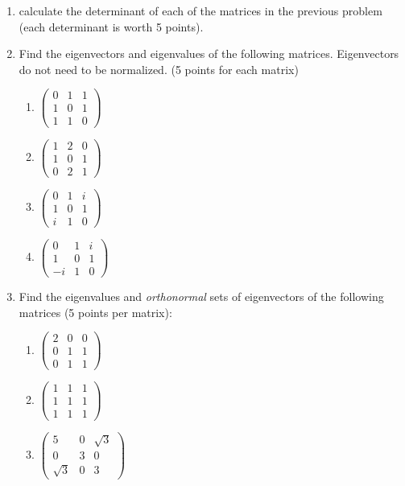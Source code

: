 \documentclass{article}
\begin{document}
\begin{enumerate}
\item calculate the determinant of each of the matrices in the previous problem (each determinant is worth 5 points). 


\item Find the eigenvectors and eigenvalues of the
following matrices.  Eigenvectors do not need to be normalized. (5 points for each matrix)

\begin{enumerate}
\item  $\left( 
\begin{array}{rrr}
0 & 1 & 1 \\ 
1 & 0 & 1 \\ 
1 & 1 & 0
\end{array}
\right) $

\item  $\left( 
\begin{array}{rrr}
1 & 2 & 0 \\ 
1 & 0 & 1 \\ 
0 & 2 & 1
\end{array}
\right) $

\item  $\left( 
\begin{array}{rrr}
0 & 1 & i \\ 
1 & 0 & 1 \\ 
i & 1 & 0
\end{array}
\right) $

\item  $\left( 
\begin{array}{rrr}
0 & 1 & i \\ 
1 & 0 & 1 \\ 
-i & 1 & 0
\end{array}
\right) $
\end{enumerate}


\item Find the eigenvalues and \emph{orthonormal} sets of eigenvectors of the following matrices (5 points per matrix):

\begin{enumerate}
\item  $\left( 
\begin{array}{rrr}
2 & 0 & 0 \\ 
0 & 1 & 1 \\ 
0 & 1 & 1
\end{array}
\right) $

\item  $\left( 
\begin{array}{rrr}
1 & 1 & 1 \\ 
1 & 1 & 1 \\ 
1 & 1 & 1
\end{array}
\right) $

\item  $\left( 
\begin{array}{rrr}
5 & 0 & \sqrt{3} \\ 
0 & 3 & 0 \\ 
\sqrt{3} & 0 & 3
\end{array}
\right) $
\end{enumerate}




\end{enumerate}
\end{document}
